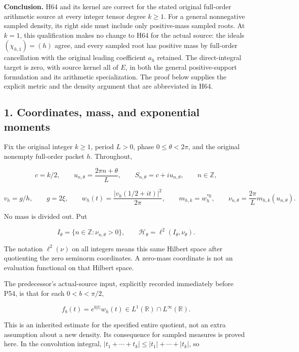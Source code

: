 \documentclass{article}
\begin{document}
\textbf{Conclusion.} H64 and its kernel are correct for the stated original full-order arithmetic source at every integer tensor degree \(k \ge 1\). For a general nonnegative sampled density, its right side must include only positive-mass sampled roots. At \(k = 1\), this qualification makes no change to H64 for the actual source: the ideals \((\chi_{h,1})=(h)\) agree, and every sampled root has positive mass by full-order cancellation with the original leading coefficient \(a_h\) retained. The direct-integral target is zero, with source kernel all of \(E\), in both the general positive-support formulation and its arithmetic specialization. The proof below supplies the explicit metric and the density argument that are abbreviated in H64.

\subsection{1. Coordinates, mass, and exponential moments}\label{coordinates-mass-and-exponential-moments}

Fix the original integer \(k \ge 1\), period \(L > 0\), phase \(0 \le \theta < 2 \pi\), and the original nonempty full-order packet \(h\). Throughout,

\[
c=k/2,\qquad
u_{n,\theta}=\frac{2\pi n+\theta}{L},\qquad
S_{n,\theta}=c+i u_{n,\theta},\qquad n\in\mathbb Z,
\tag{CQ1}
\]

\[
v_h=g/h,\qquad g=2\xi,\qquad
w_h(t)=\frac{|v_h(1/2+it)|^2}{2\pi},\qquad
m_{h,k}=w_h^{*k},\qquad
\nu_{n,\theta}=\frac{2\pi}{L}m_{h,k}(u_{n,\theta}).
\tag{CQ2}
\]

No mass is divided out. Put

\[
I_\theta=\{n\in\mathbb Z:\nu_{n,\theta}>0\},\qquad
\mathcal H_\theta=\ell^2(I_\theta,\nu_\theta).
\tag{CQ3}
\]

The notation \(\ell^2(\nu)\) on all integers means this same Hilbert space after quotienting the zero seminorm coordinates. A zero-mass coordinate is not an evaluation functional on that Hilbert space.

The predecessor's actual-source input, explicitly recorded immediately before P54, is that for each \(0 < b < \pi/2\),

\[
f_b(t)=e^{b|t|}w_h(t)\in L^1(\mathbb R)\cap L^\infty(\mathbb R).
\tag{CQ4}
\]

This is an inherited estimate for the specified entire quotient, not an extra assumption about a new density. Its consequence for sampled measures is proved here. In the convolution integral, \(|t_1+\cdots+t_k| \le |t_1|+\cdots+|t_k|\), so
\end{document}
